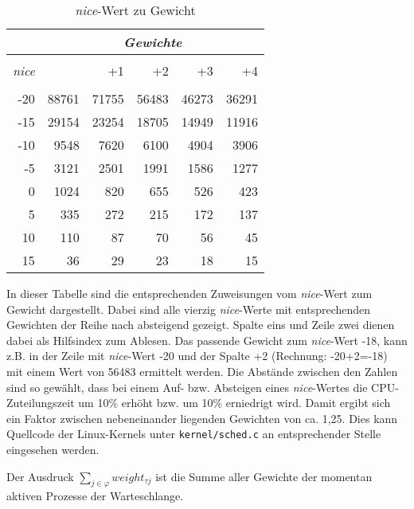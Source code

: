 \begin {table}[h]
\begin{center}
\begin{tabular}{r|rrrrr}
 &	\multicolumn{5}{c}{\textit{Gewichte}} \\
	\hline\hline
	\\[\dimexpr-\normalbaselineskip+2pt]
	\textit{nice} & &+1	&	+2	& +3	& +4	\\
	\hline
    \\[\dimexpr-\normalbaselineskip+2pt]
	-20	&	88761	&	71755	&	56483	&	46273	&	36291	\\
	-15	&	29154 	&	23254 	&	18705 	&	14949 	&	11916	\\
	-10	&	9548	&	7620	&	6100	&	4904	&	3906	\\
	-5 	&	3121 	&	2501 	&	1991 	&	1586 	&	1277	\\
	0	&	1024 	&	820		&	655		&	526		&	423		\\
	5 	&	335 	&	272		& 	215		&	172		&	137		\\
	10	&	110		&	87 		&	70 		&	56 		&	45		\\
	15 	&	36 		&	29 		&	23 		&	18 		&	15	 	\\		
\end{tabular}
\caption {\textit{nice}-Wert zu Gewicht} \label{tab:nice2weight} 
\end{center}
\end{table}


In dieser Tabelle sind die entsprechenden Zuweisungen vom \textit{nice}-Wert zum Gewicht dargestellt. 
Dabei sind alle vierzig \textit{nice}-Werte mit entsprechenden Gewichten der Reihe nach absteigend gezeigt.
Spalte eins und Zeile zwei dienen dabei als Hilfsindex zum Ablesen. Das passende Gewicht zum \textit{nice}-Wert -18, kann z.B. in der Zeile mit \textit{nice}-Wert -20 und der Spalte +2 (Rechnung: -20+2=-18) mit einem Wert von 56483 ermittelt werden.
Die Abstände zwischen den Zahlen sind so gewählt, dass bei einem Auf- bzw. Absteigen eines \textit{nice}-Wertes die CPU-Zuteilungszeit um 10\% erhöht bzw. um 10\% erniedrigt wird. Damit ergibt sich ein Faktor zwischen nebeneinander liegenden Gewichten von ca. 1,25. Dies kann Quellcode der Linux-Kernels unter \texttt{kernel/sched.c} an entsprechender Stelle eingesehen werden. 

Der Ausdruck \textit{$\sum_{j\in\varphi} weight_{\tau j}$} ist die Summe aller Gewichte der momentan aktiven Prozesse der Warte\-schlan\-ge.

